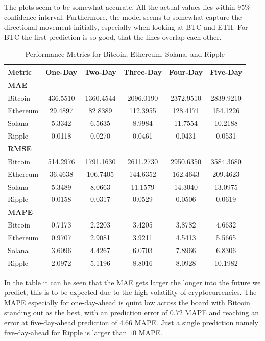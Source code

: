 \noindent The plots seem to be somewhat accurate. All the actual values lies within $95\%$ confidence interval. Furthermore, the model seems to somewhat capture the directional movement initially, especially when looking at BTC and ETH. For BTC the first prediction is so good, that the lines overlap each other.
\begin{table}[H]
\centering
\begin{tabular}{lccccc}
\toprule
\textbf{Metric} & \textbf{One-Day} & \textbf{Two-Day} & \textbf{Three-Day} & \textbf{Four-Day} & \textbf{Five-Day} \\
\midrule
\textbf{MAE} & & & & & \\
Bitcoin   & 436.5510 & 1360.4544 & 2096.0190 & 2372.9510 & 2839.9210 \\
Ethereum  &  29.4897 &   82.8389 &  112.3955 &  128.4171 &  154.1226 \\
Solana    &   5.3342 &    6.5635 &    8.9984 &   11.7554 &   10.2188 \\
Ripple    &   0.0118 &    0.0270 &    0.0461 &    0.0431 &    0.0531 \\
\midrule
\textbf{RMSE} & & & & & \\
Bitcoin   & 514.2976 & 1791.1630 & 2611.2730 & 2950.6350 & 3584.3680 \\
Ethereum  &  36.4638 &  106.7405 &  144.6352 &  162.4643 &  209.4623 \\
Solana    &   5.3489 &    8.0663 &   11.1579 &   14.3040 &   13.0975 \\
Ripple    &   0.0158 &    0.0317 &    0.0529 &    0.0506 &    0.0619 \\
\midrule
\textbf{MAPE} & & & & & \\
Bitcoin   &   0.7173 &    2.2203 &    3.4205 &    3.8782 &    4.6632 \\
Ethereum  &   0.9707 &    2.9081 &    3.9211 &    4.5413 &    5.5665 \\
Solana    &   3.6096 &    4.4267 &    6.0703 &    7.8966 &    6.8306 \\
Ripple    &   2.0972 &    5.1196 &    8.8016 &    8.0928 &   10.1982 \\
\bottomrule
\end{tabular}
\caption{Performance Metrics for Bitcoin, Ethereum, Solana, and Ripple}
\label{fig:johansen_RMSE_MAE_MAPE}
\end{table}
\noindent In the table it can be seen that the MAE gets larger the longer into the future we predict, this is to be expected due to the high volatility of cryptocurrencies. The MAPE especially for one-day-ahead is quint low across the board with Bitcoin standing out as the best, with an prediction error of $0.72$ MAPE and reaching an error at five-day-ahead prediction of $4.66$ MAPE. Just a single prediction namely five-day-ahead for Ripple is larger than $10$ MAPE.\\


